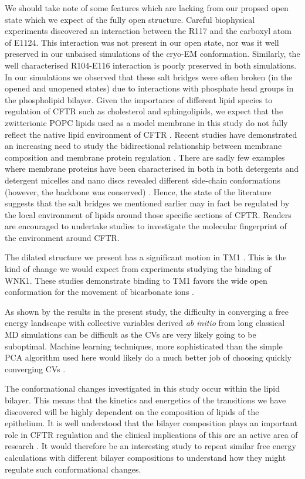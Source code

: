We should take note of some features which are lacking from our propsed open state which we expect of the fully open structure. Careful biophysical experiments discovered an interaction between the R117 and the carboxyl atom of E1124. This interaction was not present in our open state, nor was it well preserved in our unbaised simulations of the cryo-EM conformation. Similarly, the well characterised R104-E116 interaction is poorly preserved in both simulations. In our simulations we observed that these salt bridges were often broken (in the opened and unopened states) due to interactions with phosphate head groups in the phospholipid bilayer. Given the importance of different lipid species to regulation of CFTR such as cholesterol and sphingolipids, we expect that the zwitterionic POPC lipids used as a model membrane in this study do not fully reflect the native lipid environment of CFTR \cite{farinha2018, cottrill2020}. Recent studies have demonstrated an increasing need to study the bidirectional relationship between membrane composition and membrane protein regulation \cite{lin2022, kapoor2021, cui2020}. There are sadly few examples where membrane proteins have been characterised in both in both detergents and detergent micelles and nano discs revealed different side-chain conformations (however, the backbone was conserved) \cite{autzen2019, gao2016, cheng2015}. Hence, the state of the literature suggests that the salt bridges we mentioned earlier may in fact be regulated by the local environment of lipids around those specific sections of CFTR. Readers are encouraged to undertake studies to investigate the molecular fingerprint of the environment around CFTR.

The dilated structure we present has a significant motion in TM1 . This is the kind of change we would expect from experiments studying the binding of WNK1. These studies demonstrate binding to TM1 favors the wide open conformation for the movement of bicarbonate ions \cite{kim2019}. 

As shown by the results in the present study, the difficulty in converging a free energy landscape with collective variables derived \textit {ab initio} from long classical MD simulations can be difficult as the CVs are very likely going to be suboptimal. Machine learning techniques, more sophisticated than the simple PCA algorithm used here would likely do a much better job of choosing quickly converging CVs \cite{}. 

The conformational changes investigated in this study occur within the lipid bilayer. This means that the kinetics and energetics of the transitions we have discovered will be highly dependent on the composition of lipids of the epithelium. It is well understood that the bilayer composition plays an important role in CFTR regulation and the clinical implications of this are an active area of research \cite{cui2020, cottrill2020}. It would therefore be an interesting study to repeat similar free energy calculations with different bilayer compositions to understand how they might regulate such conformational changes.

